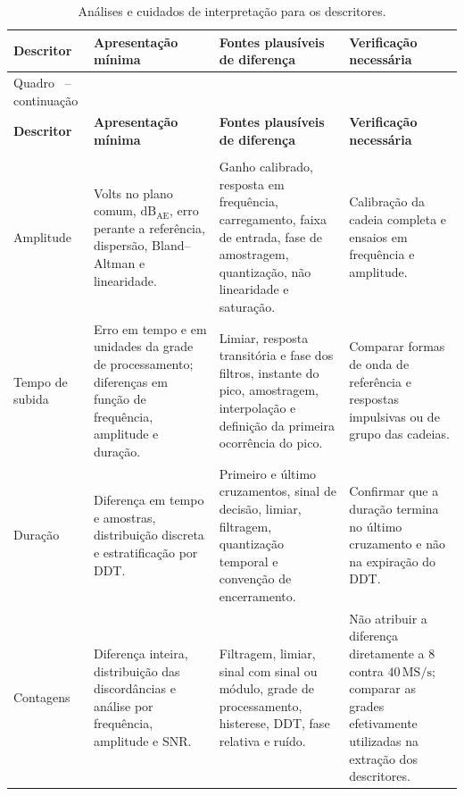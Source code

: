 \begingroup
\renewcommand{\tablename}{Quadro}
\footnotesize
\renewcommand{\arraystretch}{1.22}
\begin{longtable}{|
		>{\raggedright\arraybackslash}p{2.5cm}|
		>{\raggedright\arraybackslash}p{4.0cm}|
		>{\raggedright\arraybackslash}p{4.1cm}|
		>{\raggedright\arraybackslash}p{3.6cm}|}
	\caption{Análises e cuidados de interpretação para os descritores.}
	\label{v2:qua:interpretacao_descritores_secao6}\\
	\hline
	\textbf{Descritor} & \textbf{Apresentação mínima} & \textbf{Fontes plausíveis de diferença} & \textbf{Verificação necessária} \\
	\hline
	\endfirsthead
	\multicolumn{4}{c}
	{\tablename\ \thetable{} -- continuação}\\
	\hline
	\textbf{Descritor} & \textbf{Apresentação mínima} & \textbf{Fontes plausíveis de diferença} & \textbf{Verificação necessária} \\
	\hline
	\endhead
	\hline
	\multicolumn{4}{r}{Continua na próxima página.}\\
	\endfoot
	\hline
	\endlastfoot
	Amplitude & Volts no plano comum, \(\mathrm{dB}_{\mathrm{AE}}\), erro perante a referência, dispersão, Bland--Altman e linearidade. & Ganho calibrado, resposta em frequência, carregamento, faixa de entrada, fase de amostragem, quantização, não linearidade e saturação. & Calibração da cadeia completa e ensaios em frequência e amplitude. \\
	\hline
	Tempo de subida & Erro em tempo e em unidades da grade de processamento; diferenças em função de frequência, amplitude e duração. & Limiar, resposta transitória e fase dos filtros, instante do pico, amostragem, interpolação e definição da primeira ocorrência do pico. & Comparar formas de onda de referência e respostas impulsivas ou de grupo das cadeias. \\
	\hline
	Duração & Diferença em tempo e amostras, distribuição discreta e estratificação por DDT. & Primeiro e último cruzamentos, sinal de decisão, limiar, filtragem, quantização temporal e convenção de encerramento. & Confirmar que a duração termina no último cruzamento e não na expiração do DDT. \\
	\hline
	Contagens & Diferença inteira, distribuição das discordâncias e análise por frequência, amplitude e SNR. & Filtragem, limiar, sinal com sinal ou módulo, grade de processamento, histerese, DDT, fase relativa e ruído. & Não atribuir a diferença diretamente a \(8\) contra \(40\,\mathrm{MS/s}\); comparar as grades efetivamente utilizadas na extração dos descritores. \\

\end{longtable}
